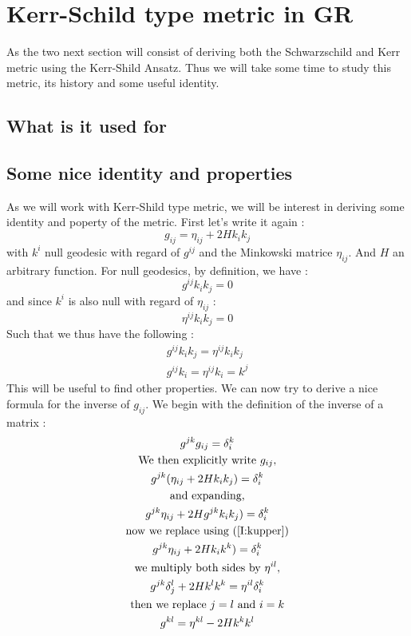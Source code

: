 \documentclass[a4paper,12pt]{article}
\theoremstyle{definition}
\begin{document}
\section{Kerr-Schild type metric in GR}
As the two next section will consist of deriving both the Schwarzschild and Kerr metric using the Kerr-Shild Ansatz.
Thus we will take some time to study this metric, its history and some useful identity.
\subsection{What is it used for}
\subsection{Some nice identity and properties}
As we will work with Kerr-Shild type metric, we will be interest in deriving some identity and poperty of the metric.
First let's write it again :
\begin{equation}
	g_{ij}=\eta_{ij}+2Hk_ik_j
\end{equation}
with $k^i$ null geodesic with regard of $g^{ij}$ and the Minkowski matrice $\eta_{ij}$.
And $H$ an arbitrary function.
For null geodesics, by definition, we have :
\begin{equation}
	g^{ij}k_ik_j=0
\end{equation}
and since $k^i$ is also null with regard of $\eta_{ij}$ :
\begin{equation}
	\eta^{ij}k_ik_j=0
\end{equation}
Such that we thus have the following :
\begin{align}
	g^{ij}k_ik_j=\eta^{ij}k_ik_j \label{I:kequi}\\
	g^{ij}k_i=\eta^{ij}k_i=k^j \label{I:kupper}
\end{align}
This will be useful to find other properties.
We can now try to derive a nice formula for the inverse of $g_{ij}$.
We begin with the definition of the inverse of a matrix :
\begin{gather*}
	g^{jk}g_{ij}=\delta^k_i \\
	\text{We then explicitly write } g_{ij},\\
	g^{jk}(\eta_{ij}+2Hk_ik_j)=\delta^k_i\\
	\text{and expanding,}\\
	g^{jk}\eta_{ij}+2Hg^{jk}k_ik_j)=\delta^k_i\\
	\text{now we replace using (\ref{I:kupper})}\\
	g^{jk}\eta_{ij}+2Hk_ik^k)=\delta^k_i\\
	\text{we multiply both sides by }\eta^{il},\\
	g^{jk}\delta^l_j+2Hk^lk^k=\eta^{il}\delta^k_i\\
	\text{then we replace $j=l$ and $i=k$}\\
	g^{kl}=\eta^{kl}-2Hk^kk^l
\end{gather*}
\end{document}
